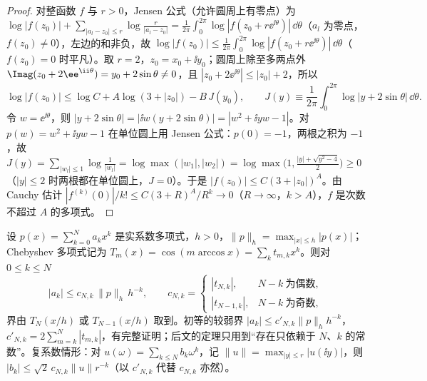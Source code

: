 \begin{proof}
对整函数 $f$ 与 $r>0$，Jensen 公式（允许圆周上有零点）\cite[第~15.16--15.20~节]{Rudin1987}为 $\log|f(z_0)|+\sum_{|a_l-z_0|\le r}\log\frac{r}{|a_l-z_0|}=\frac1{2\pi}\int_0^{2\pi}\log|f(z_0+r\ee^{\ii\theta})|\,\dd\theta$（$a_l$ 为零点，$f(z_0)\ne0$），左边的和非负，故 $\log|f(z_0)|\le\frac1{2\pi}\int_0^{2\pi}\log|f(z_0+r\ee^{\ii\theta})|\,\dd\theta$（$f(z_0)=0$ 时平凡）。取 $r=2$，$z_0=x_0+\ii y_0$；圆周上除至多两点外 $\Imag(z_0+2\ee^{\ii\theta})=y_0+2\sin\theta\ne0$，且 $|z_0+2\ee^{\ii\theta}|\le|z_0|+2$，所以
\[
\log|f(z_0)|\le\log C+A\log(3+|z_0|)-B\,J(y_0),\qquad J(y)\equiv\frac1{2\pi}\int_0^{2\pi}\log|y+2\sin\theta|\,\dd\theta .
\]
令 $w=\ee^{\ii\theta}$，则 $|y+2\sin\theta|=|\ii w(y+2\sin\theta)|=|w^2+\ii yw-1|$。对 $p(w)=w^2+\ii yw-1$ 在单位圆上用 Jensen 公式：$p(0)=-1$，两根之积为 $-1$，故 $J(y)=\sum_{|w_l|\le1}\log\frac1{|w_l|}=\log\max(|w_1|,|w_2|)=\log\max\big(1,\frac{|y|+\sqrt{y^2-4}}2\big)\ge0$（$|y|\le2$ 时两根都在单位圆上，$J=0$）。于是 $|f(z_0)|\le C(3+|z_0|)^A$。由 Cauchy 估计 $|f^{(k)}(0)|/k!\le C(3+R)^A/R^k\to0$（$R\to\infty$，$k>A$），$f$ 是次数不超过 $A$ 的多项式。
\end{proof}

\begin{lemma}\label{lem:appK-markov}
设 $p(x)=\sum_{k=0}^Na_kx^k$ 是实系数多项式，$h>0$，$\|p\|_h=\max_{|x|\le h}|p(x)|$；Chebyshev 多项式记为 $T_m(x)=\cos(m\arccos x)=\sum_kt_{m,k}x^k$。则对 $0\le k\le N$
\begin{equation}\label{eq:appK-markov}
|a_k|\le c_{N,k}\,\|p\|_h\,h^{-k},\qquad
c_{N,k}=\begin{cases}|t_{N,k}|,&N-k\ \text{为偶数},\\|t_{N-1,k}|,&N-k\ \text{为奇数},\end{cases}
\end{equation}
界由 $T_N(x/h)$ 或 $T_{N-1}(x/h)$ 取到。初等的较弱界 $|a_k|\le c'_{N,k}\|p\|_hh^{-k}$，$c'_{N,k}=2\sum_{m=k}^N|t_{m,k}|$，有完整证明；后文的定理只用到“存在只依赖于 $N$、$k$ 的常数”。复系数情形：对 $u(\omega)=\sum_{k\le N}b_k\omega^k$，记 $\|u\|=\max_{|y|\le r}|u(\ii y)|$，则 $|b_k|\le\sqrt2\,c_{N,k}\|u\|r^{-k}$（以 $c'_{N,k}$ 代替 $c_{N,k}$ 亦然）。
\end{lemma}

